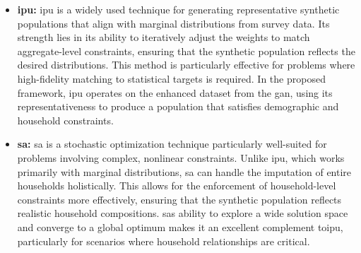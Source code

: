 \begin{enumerate}
    \begin{itemize}
        \item \textbf{\gls{ipu}:} 
        \gls{ipu} is a widely used technique for generating representative synthetic populations that align with marginal distributions from survey data. Its strength lies in its ability to iteratively adjust the weights to match aggregate-level constraints, ensuring that the synthetic population reflects the desired distributions. This method is particularly effective for problems where high-fidelity matching to statistical targets is required. In the proposed framework, \gls{ipu} operates on the enhanced dataset from the \gls{gan}, using its representativeness to produce a population that satisfies demographic and household constraints.
        
    
        \item \textbf{\gls{sa}:} \gls{sa} is a stochastic optimization technique particularly well-suited for problems involving complex, nonlinear constraints. Unlike \gls{ipu}, which works primarily with marginal distributions, \gls{sa} can handle the imputation of entire households holistically. This allows for the enforcement of household-level constraints more effectively, ensuring that the synthetic population reflects realistic household compositions. \Glspl{sa} ability to explore a wide solution space and converge to a global optimum makes it an excellent complement to\gls{ipu}, particularly for scenarios where household relationships are critical.
        
        
    \end{itemize}
\end{enumerate}